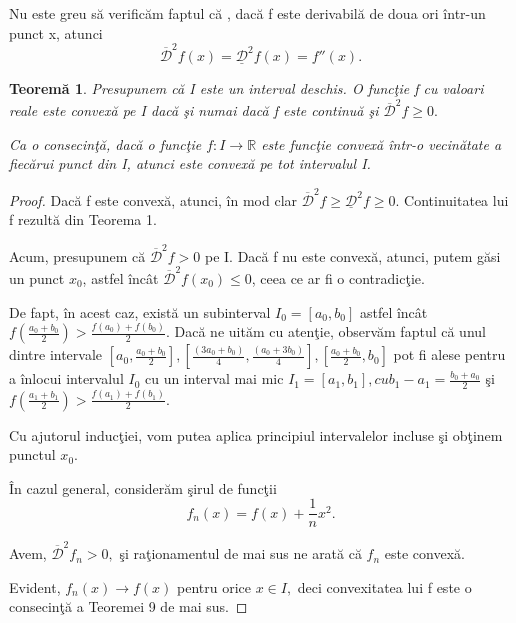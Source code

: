 \documentclass[a4paper,12pt,oneside]{report}
\newtheorem{theorem}{Teorem\u a}
\begin{document}
Nu este greu s\u{a} verific\u{a}m faptul c\u{a} , dac\u{a} f este derivabil\u{a} de doua ori \^{i}ntr-un punct x, atunci
\begin{displaymath}
   \overline{ \mathcal{D}}^{2}f\left ( x \right ) = \underline{\mathcal{D}}^{2}f\left ( x \right ) = {f}''\left ( x \right ). \label{eq:1.13} \tag{1.13}
\end{displaymath}
\begin{theorem}
Presupunem c\u{a} I este un interval deschis. O func\c{t}ie f cu valoari reale este convex\u{a} pe I dac\u{a} \c{s}i numai dac\u{a} f este continu\u{a} \c{s}i  \(\overline{ \mathcal{D}}^{2}f\geq 0.\)

  Ca o consecin\c{t}\u{a}, dac\u{a} o func\c{t}ie \(f : I \rightarrow \mathbb{R}\) este  func\c{t}ie convex\u{a}  \^{i}ntr-o vecin\u{a}tate a fiec\u{a}rui punct din I, atunci este convex\u{a} pe tot intervalul I.
\end{theorem}
\begin{proof}
Dac\u{a} f este convex\u{a}, atunci, \^{i}n mod clar \(\overline{ \mathcal{D}}^{2}f\geq \underline{\mathcal{D}}^{2}f\geq 0.\) Continuitatea lui f rezult\u{a} din Teorema 1.

Acum, presupunem c\u{a} \(\overline{ \mathcal{D}}^{2}f > 0\) pe I. Dac\u{a} f nu este convex\u{a}, atunci, putem g\u{a}si un punct \(x_{0}\), astfel \^{i}nc\^{a}t \(\overline{ \mathcal{D}}^{2}f \left ( x_{0} \right )\leq 0\), ceea ce ar fi o contradic\c{t}ie.

De fapt, \^{i}n acest caz, exist\u{a} un subinterval \(I_{0} = \left [ a_{0}, b_{0} \right ]\) astfel \^{i}nc\^{a}t \(f\left ( \frac{a_{0} + b_{0}}{2} \right )> \frac{f\left ( a_{0} \right ) + f\left ( b_{0} \right )}{2}.\) Dac\u{a} ne uit\u{a}m cu aten\c{t}ie, observ\u{a}m faptul c\u{a} unul dintre intervale \newline \(\left [ a_{0}, \frac{a_{0}+b_{0}}{2} \right ], \left [ \frac{\left ( 3a_{0}+b_{0} \right )}{4},\frac{\left ( a_{0}+3b_{0} \right )}{4} \right ],\left [\frac{a_{0}+b_{0}}{2}, b_{0} \right ]\) pot fi alese pentru a \^{i}nlocui intervalul \(I_{0}\) cu un interval mai mic \(I_{1}= \left [ a_{1}, b_{1} \right ], cu  b_{1} -  a_{1}= \frac{b_{0}+ a_{0}}{2}\) \c{s}i \(f\left ( \frac{a_{1}+b_{1}}{2} \right ) > \frac{f\left ( a_{1} \right ) + f\left ( b_{1} \right )}{2}.\)

Cu ajutorul induc\c{t}iei, vom  putea aplica principiul intervalelor incluse \c{s}i ob\c{t}inem punctul \(x_{0}.\)

\^{I}n cazul general, consider\u{a}m \c{s}irul de func\c{t}ii
\begin{displaymath}
   f_{n}\left ( x \right ) = f\left ( x \right ) + \frac{1}{n}x^{2}.
\end{displaymath}

Avem, \(\overline{ \mathcal{D}}^{2}f _{n} > 0,\) \c{s}i ra\c{t}ionamentul de mai sus ne arat\u{a} c\u{a} \(f _{n}\) este convex\u{a}.

Evident, \(f _{n}\left ( x \right ) \rightarrow f\left ( x \right )\) pentru orice \(x \in I,\) deci convexitatea lui f este o consecin\c{t}\u{a} a Teoremei 9 de mai sus.
\end{proof}
\end{document}
